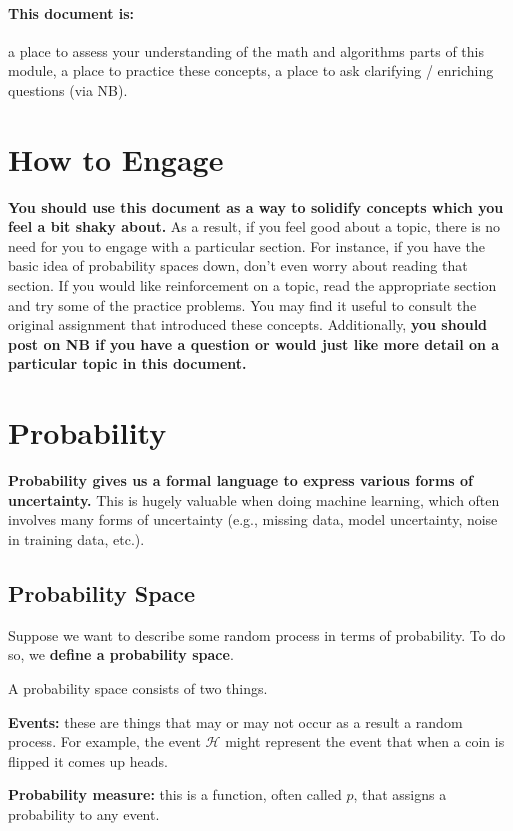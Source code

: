 \documentclass[review_Solutions]{subfiles}
\begin{document}
 \paragraph{\textbf{This document is:}} a place to assess your understanding of the math and algorithms parts of this module, a place to practice these concepts, a place to ask clarifying / enriching questions (via NB).

\section{How to Engage}

\textbf{You should use this document as a way to solidify concepts which you feel a bit shaky about.}  As a result, if you feel good about a topic, there is no need for you to engage with a particular section.  For instance, if you have the basic idea of probability spaces down, don't even worry about reading that section.  If you would like reinforcement on a topic, read the appropriate section and try some of the practice problems.  You may find it useful to consult the original assignment that introduced these concepts.  Additionally, \textbf{you should post on NB if you have a question or would just like more detail on a particular topic in this document.}


\section{Probability}

\textbf{Probability gives us a formal language to express various forms of uncertainty.}  This is hugely valuable when doing machine learning, which often involves many forms of uncertainty (e.g., missing data, model uncertainty, noise in training data, etc.).

\subsection{Probability Space}
Suppose we want to describe some random process in terms of probability.  To do so, we \textbf{define a probability space}.

A probability space consists of two things.
\bi
\item \textbf{Events:} these are things that may or may not occur as a result a random process.  For example, the event $\mathcal{H}$ might represent the event that when a coin is flipped it comes up heads.
\item \textbf{Probability measure:} this is a function, often called $p$, that assigns a probability to any event.
\end{document}
